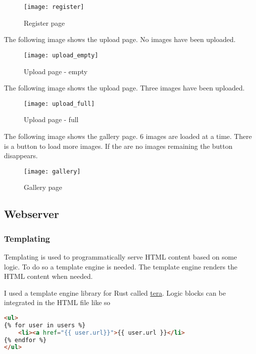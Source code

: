 \documentclass[../documentation.tex]{subfiles}
\begin{document}
\begin{figure}[h]
    \centering
    \texttt{[image: register]}
    \caption{Register page}
\end{figure}

The following image shows the upload page.
No images have been uploaded.

\begin{figure}[h]
    \centering
    \texttt{[image: upload\_empty]}
    \caption{Upload page - empty}
\end{figure}

\pagebreak

The following image shows the upload page.
Three images have been uploaded.

\begin{figure}[h]
    \centering
    \texttt{[image: upload\_full]}
    \caption{Upload page - full}
\end{figure}

The following image shows the gallery page.
6 images are loaded at a time. There is a button
to load more images. If the are no images remaining
the button disappears.

\begin{figure}[h]
    \centering
    \texttt{[image: gallery]}
    \caption{Gallery page}
\end{figure}

\pagebreak

\subsection{Webserver}

\subsubsection{Templating}

Templating is used to programmatically serve HTML content based on some logic.
To do so a template engine is needed. The template engine renders the HTML content
when needed.

I used a template engine library for Rust called
\href{https://github.com/Keats/tera}{tera}.
Logic blocks can be integrated in the HTML file like so
\begin{lstlisting}[language=html]
<ul>
{% for user in users %}
    <li><a href="{{ user.url}}">{{ user.url }}</li>
{% endfor %}
</ul>
\end{lstlisting}
\end{document}
